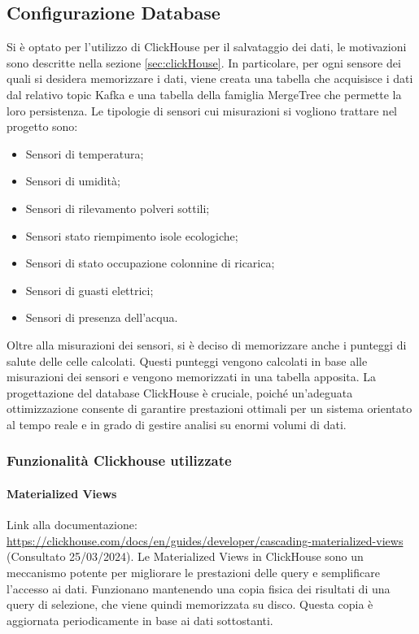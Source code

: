 
\subsection{Configurazione Database}
Si è optato per l'utilizzo di ClickHouse per il salvataggio dei dati, le motivazioni sono descritte nella sezione \ref{sec:clickHouse}. In particolare, per ogni sensore dei quali si desidera memorizzare i dati, viene creata una tabella che acquisisce i dati dal relativo topic Kafka e una tabella della famiglia MergeTree che permette la loro persistenza.
Le tipologie di sensori cui misurazioni si vogliono trattare nel progetto sono:
\begin{itemize}
    \item Sensori di temperatura;
    \item Sensori di umidità;
    \item Sensori di rilevamento polveri sottili; 
    \item Sensori stato riempimento isole ecologiche;
    \item Sensori di stato occupazione colonnine di ricarica;
    \item Sensori di guasti elettrici;
    \item Sensori di presenza dell'acqua.
\end{itemize}
Oltre alla misurazioni dei sensori, si è deciso di memorizzare anche i punteggi di salute delle celle calcolati. Questi punteggi vengono calcolati in base alle misurazioni dei sensori e vengono memorizzati in una tabella apposita.
La progettazione del database ClickHouse è cruciale, poiché un'adeguata ottimizzazione consente di garantire prestazioni ottimali per un sistema orientato al tempo reale e in grado di gestire analisi su enormi volumi di dati.


\subsubsection{Funzionalità Clickhouse utilizzate}
\paragraph{Materialized Views}
Link alla documentazione: \href{https://clickhouse.com/docs/en/guides/developer/cascading-materialized-views}{https://clickhouse.com/docs/en/guides/developer/cascading-materialized-views} (Consultato 25/03/2024).\newline
Le Materialized Views in ClickHouse sono un meccanismo potente per migliorare le prestazioni delle query e semplificare l'accesso ai dati. Funzionano mantenendo una copia fisica dei risultati di una query di selezione, che viene quindi memorizzata su disco. Questa copia è aggiornata periodicamente in base ai dati sottostanti.

